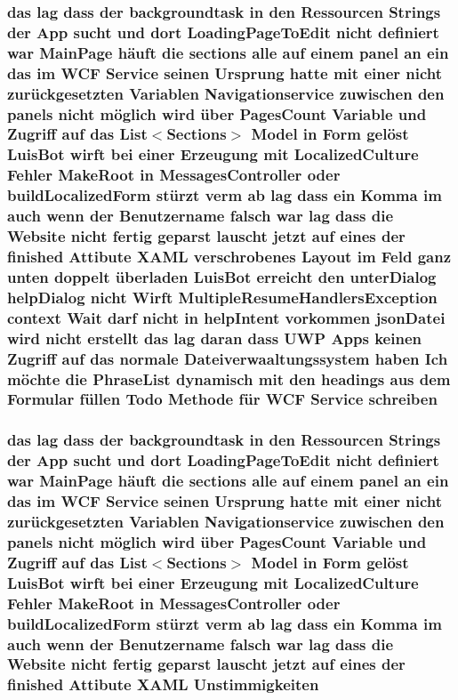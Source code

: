 \subsubsection[{\texorpdfstring{schreiben}{schreiben}}]{\setlength{\rightskip}{0pt plus 5cm}das lag dass der backgroundtask in den Ressourcen Strings der App sucht und dort Loading\+Page\+To\+Edit nicht definiert {\bf war} Main\+Page häuft die sections alle auf einem panel an ein das im W\+CF Service seinen Ursprung hatte mit einer nicht zurückgesetzten Variablen Navigationservice zuwischen den panels nicht möglich wird über Pages\+Count Variable und Zugriff auf das List$<$Sections$>$ Model in Form gelöst Luis\+Bot wirft bei einer Erzeugung mit Localized\+Culture Fehler Make\+Root in Messages\+Controller oder build\+Localized\+Form stürzt verm ab lag dass ein Komma im auch wenn der Benutzername falsch {\bf war} lag dass die Website nicht fertig geparst lauscht jetzt auf eines der finished Attibute X\+A\+ML verschrobenes Layout im Feld ganz unten doppelt überladen Luis\+Bot erreicht den unter\+Dialog help\+Dialog nicht Wirft Multiple\+Resume\+Handlers\+Exception context Wait darf nicht in help\+Intent vorkommen json\+Datei wird nicht erstellt das lag {\bf daran} dass U\+WP Apps keinen Zugriff auf das normale Dateiverwaaltungssystem haben Ich möchte die Phrase\+List dynamisch mit den headings aus dem Formular füllen Todo Methode für W\+CF Service schreiben}\hypertarget{_r_e_a_d_m_e_8txt_a7cfea504e3a5e9a3a42e1f0a414a9efa}{}\label{_r_e_a_d_m_e_8txt_a7cfea504e3a5e9a3a42e1f0a414a9efa}
\subsubsection[{\texorpdfstring{Unstimmigkeiten}{Unstimmigkeiten}}]{\setlength{\rightskip}{0pt plus 5cm}das lag dass der backgroundtask in den Ressourcen Strings der App sucht und dort Loading\+Page\+To\+Edit nicht definiert {\bf war} Main\+Page häuft die sections alle auf einem panel an ein das im W\+CF Service seinen Ursprung hatte mit einer nicht zurückgesetzten Variablen Navigationservice zuwischen den panels nicht möglich wird über Pages\+Count Variable und Zugriff auf das List$<$Sections$>$ Model in Form gelöst Luis\+Bot wirft bei einer Erzeugung mit Localized\+Culture Fehler Make\+Root in Messages\+Controller oder build\+Localized\+Form stürzt verm ab lag dass ein Komma im auch wenn der Benutzername falsch {\bf war} lag dass die Website nicht fertig geparst lauscht jetzt auf eines der finished Attibute X\+A\+ML Unstimmigkeiten}\hypertarget{_r_e_a_d_m_e_8txt_ac0dcc138103869e0359e06225049e770}{}\label{_r_e_a_d_m_e_8txt_ac0dcc138103869e0359e06225049e770}
